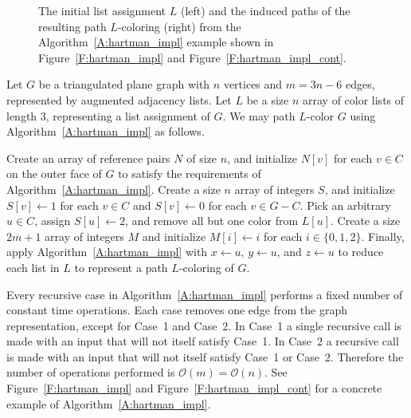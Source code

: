 \documentclass[12pt,letterpaper]{article}
\theoremstyle{plain}
\theoremstyle{definition}
\theoremstyle{break}
\begin{document}
\begin{figure}
\begin{center}
\caption{The initial list assignment $L$ (left) and the induced paths of the
resulting path
$L$-coloring (right)
from the Algorithm~\ref{A:hartman_impl} example shown in
Figure~\ref{F:hartman_impl} and Figure~\ref{F:hartman_impl_cont}.}
\label{F:hartman_impl_comp}
\end{center}
\end{figure}

Let $G$ be a triangulated plane graph with $n$ vertices and $m=3n-6$ edges,
represented by augmented adjacency
lists. Let $L$ be a size $n$ array of color lists of length $3$,
representing a list assignment of $G$. We may path $L$-color $G$ using
Algorithm~\ref{A:hartman_impl} as follows.

Create an array of reference pairs $N$ of size $n$, and initialize $N[v]$
for each $v\in C$ on the outer face of $G$ to satisfy
the requirements of Algorithm~\ref{A:hartman_impl}. Create a size $n$ array of
integers $S$, and initialize $S[v]\leftarrow 1$ for each $v\in C$ and
$S[v]\leftarrow 0$ for each $v\in G-C$. Pick an arbitrary $u\in C$,
assign $S[u]\leftarrow 2$, and remove all but one color from $L[u]$.
Create a size $2m+1$
array of integers $M$ and initialize $M[i]\leftarrow i$ for each
$i\in\{0,1,2\}$.
Finally, apply
Algorithm~\ref{A:hartman_impl} with $x\leftarrow u$, $y\leftarrow u$,
and $z\leftarrow u$ to reduce each list in $L$ to
represent a path $L$-coloring of $G$.

Every recursive case in Algorithm~\ref{A:hartman_impl} performs a fixed number
of constant time operations. Each case removes one edge from the graph
representation,
except for Case~1 and Case~2. In Case~1 a single recursive call is made
with an input that will not itself satisfy Case~1. In Case~2 a recursive
call is made with an input that will not itself satisfy Case~1 or Case~2.
Therefore the number of operations performed
is $\mathcal{O}(m)=\mathcal{O}(n)$. See Figure~\ref{F:hartman_impl} and
Figure~\ref{F:hartman_impl_cont} for a concrete example of
Algorithm~\ref{A:hartman_impl}.
\end{document}
